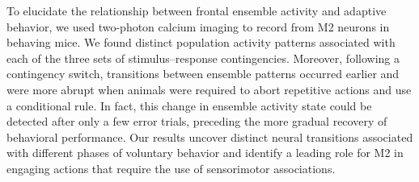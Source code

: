 To elucidate the relationship between frontal ensemble activity and adaptive behavior, we used two-photon calcium imaging to record from M2 neurons in behaving mice. We found distinct population activity patterns associated with each of the three sets of stimulus–response contingencies. Moreover, following a contingency switch, transitions between ensemble patterns occurred earlier and were more abrupt when animals were required to abort repetitive actions and use a conditional rule. In fact, this change in ensemble activity state could be detected after only a few error trials, preceding the more gradual recovery of behavioral performance. Our results uncover distinct neural transitions associated with different phases of voluntary behavior and identify a leading role for M2 in engaging actions that require the use of sensorimotor associations.